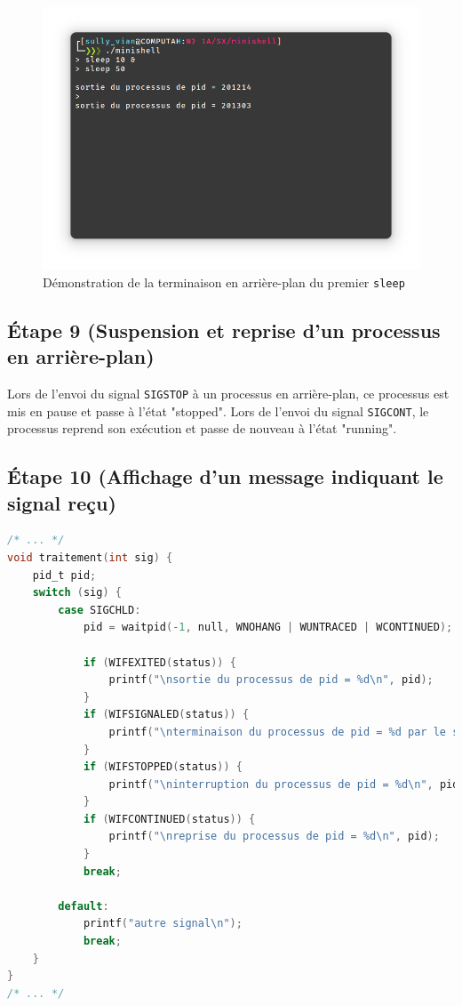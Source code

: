 \documentclass{article}
\begin{document}
\begin{figure}[H]
    \centering
    \includegraphics[width=\textwidth]{./resources/E8.png}
    \caption{Démonstration de la terminaison en arrière-plan du premier \texttt{sleep}}
    \label{fig:E8}
\end{figure}

\subsection*{Étape 9 (Suspension et reprise d'un processus en arrière-plan)}

Lors de l'envoi du signal \texttt{SIGSTOP} à un processus en arrière-plan, ce processus est mis en pause et passe à l'état "stopped". Lors de l'envoi du signal \texttt{SIGCONT}, le processus reprend son exécution et passe de nouveau à l'état "running".

\subsection*{Étape 10 (Affichage d'un message indiquant le signal reçu)}

\begin{lstlisting}[language=C, caption=ajout de la question 10]
/* ... */
void traitement(int sig) {
    pid_t pid;
    switch (sig) {
        case SIGCHLD:
            pid = waitpid(-1, null, WNOHANG | WUNTRACED | WCONTINUED);

            if (WIFEXITED(status)) {
                printf("\nsortie du processus de pid = %d\n", pid);
            }
            if (WIFSIGNALED(status)) {
                printf("\nterminaison du processus de pid = %d par le signal %d\n", pid, sig);
            }
            if (WIFSTOPPED(status)) {
                printf("\ninterruption du processus de pid = %d\n", pid);
            }
            if (WIFCONTINUED(status)) {
                printf("\nreprise du processus de pid = %d\n", pid);
            }
            break;

        default:
            printf("autre signal\n");
            break;
    }
}
/* ... */
\end{lstlisting}
\end{document}
